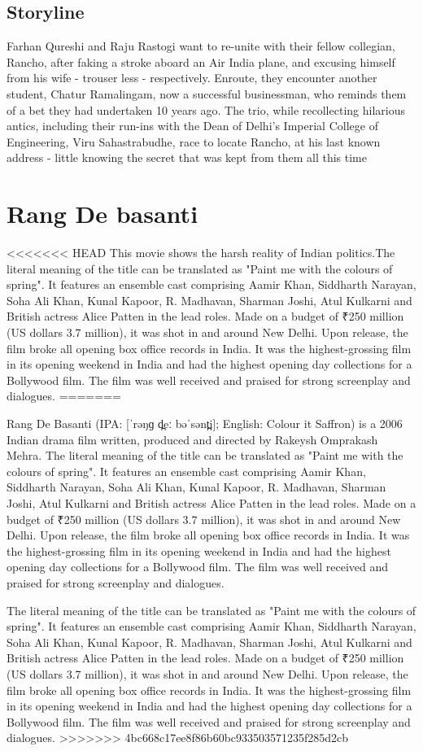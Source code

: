 \documentclass{article}
\begin{document}
\subsection{Storyline}
Farhan Qureshi and Raju Rastogi want to re-unite with their fellow collegian, Rancho, after faking a stroke aboard an Air India plane, and excusing himself from his wife - trouser less - respectively. Enroute, they encounter another student, Chatur Ramalingam, now a successful businessman, who reminds them of a bet they had undertaken 10 years ago. The trio, while recollecting hilarious antics, including their run-ins with the Dean of Delhi's Imperial College of Engineering, Viru Sahastrabudhe, race to locate Rancho, at his last known address - little knowing the secret that was kept from them all this time


\section{Rang De basanti}
<<<<<<< HEAD
This movie shows the harsh reality of Indian politics.The literal meaning of the title can be translated as "Paint me with the colours of spring". It features an ensemble cast comprising Aamir Khan, Siddharth Narayan, Soha Ali Khan, Kunal Kapoor, R. Madhavan, Sharman Joshi, Atul Kulkarni and British actress Alice Patten in the lead roles. Made on a budget of ₹250 million (US dollars 3.7 million), it was shot in and around New Delhi. Upon release, the film broke all opening box office records in India. It was the highest-grossing film in its opening weekend in India and had the highest opening day collections for a Bollywood film. The film was well received and praised for strong screenplay and dialogues.
=======

Rang De Basanti (IPA: [ˈrəŋɡ d̪eː bəˈsənt̪i]; English: Colour it Saffron) is a 2006 Indian drama film written, produced and directed by Rakeysh Omprakash Mehra. The literal meaning of the title can be translated as "Paint me with the colours of spring". It features an ensemble cast comprising Aamir Khan, Siddharth Narayan, Soha Ali Khan, Kunal Kapoor, R. Madhavan, Sharman Joshi, Atul Kulkarni and British actress Alice Patten in the lead roles. Made on a budget of ₹250 million (US dollars 3.7 million), it was shot in and around New Delhi. Upon release, the film broke all opening box office records in India. It was the highest-grossing film in its opening weekend in India and had the highest opening day collections for a Bollywood film. The film was well received and praised for strong screenplay and dialogues.

The literal meaning of the title can be translated as "Paint me with the colours of spring". It features an ensemble cast comprising Aamir Khan, Siddharth Narayan, Soha Ali Khan, Kunal Kapoor, R. Madhavan, Sharman Joshi, Atul Kulkarni and British actress Alice Patten in the lead roles. Made on a budget of ₹250 million (US dollars 3.7 million), it was shot in and around New Delhi. Upon release, the film broke all opening box office records in India. It was the highest-grossing film in its opening weekend in India and had the highest opening day collections for a Bollywood film. The film was well received and praised for strong screenplay and dialogues.
>>>>>>> 4bc668c17ee8f86b60bc933503571235f285d2cb
\end{document}
